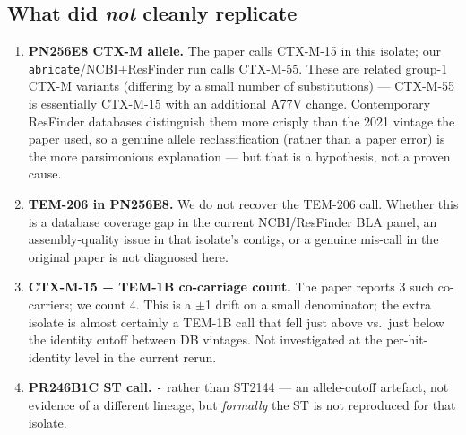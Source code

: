 \documentclass[11pt]{article}
\begin{document}
\subsection*{What did \emph{not} cleanly replicate}
\begin{enumerate}[leftmargin=1.4em]
  \item \textbf{PN256E8 CTX-M allele.} The paper calls CTX-M-15 in this
        isolate; our \texttt{abricate}/NCBI+ResFinder run calls CTX-M-55.
        These are related group-1 CTX-M variants (differing by a small
        number of substitutions) --- CTX-M-55 is essentially CTX-M-15 with
        an additional A77V change. Contemporary ResFinder databases
        distinguish them more crisply than the 2021 vintage the paper used,
        so a genuine allele reclassification (rather than a paper error) is
        the more parsimonious explanation --- but that is a hypothesis, not
        a proven cause.
  \item \textbf{TEM-206 in PN256E8.} We do not recover the TEM-206 call.
        Whether this is a database coverage gap in the current NCBI/ResFinder
        BLA panel, an assembly-quality issue in that isolate's contigs, or a
        genuine mis-call in the original paper is not diagnosed here.
  \item \textbf{CTX-M-15 + TEM-1B co-carriage count.} The paper reports 3
        such co-carriers; we count 4. This is a $\pm$1 drift on a small
        denominator; the extra isolate is almost certainly a TEM-1B call
        that fell just above vs.\ just below the identity cutoff between DB
        vintages. Not investigated at the per-hit-identity level in the
        current rerun.
  \item \textbf{PR246B1C ST call.} \texttt{-} rather than ST2144 --- an
        allele-cutoff artefact, not evidence of a different lineage, but
        \emph{formally} the ST is not reproduced for that isolate.
\end{enumerate}
\end{document}
